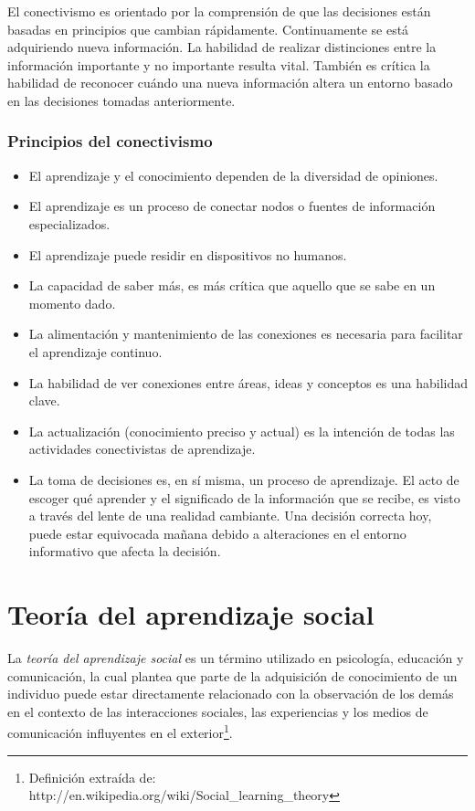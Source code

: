 El conectivismo es orientado por la comprensión de que las decisiones están
basadas en principios que cambian rápidamente. Continuamente se está adquiriendo
nueva información. La habilidad de realizar distinciones entre la información
importante y no importante resulta vital. También es crítica la habilidad de
reconocer cuándo una nueva información altera un entorno basado en las
decisiones tomadas anteriormente.

\subsubsection{Principios del conectivismo}

\begin{itemize}
\item El aprendizaje y el conocimiento dependen de la diversidad de opiniones.
\item El aprendizaje es un proceso de conectar nodos o fuentes de información
especializados.
\item El aprendizaje puede residir en dispositivos no humanos.
\item La capacidad de saber más, es más crítica que aquello que se sabe en un
momento dado.
\item La alimentación y mantenimiento de las conexiones es necesaria para
facilitar el aprendizaje continuo.
\item La habilidad de ver conexiones entre áreas, ideas y conceptos es una
habilidad clave.
\item La actualización (conocimiento preciso y actual) es la intención de todas
las actividades conectivistas de aprendizaje.
\item La toma de decisiones es, en sí misma, un proceso de aprendizaje. El acto
de escoger qué aprender y el significado de la información que se recibe, es
visto a través del lente de una realidad cambiante. Una decisión correcta hoy,
puede estar equivocada mañana debido a alteraciones en el entorno informativo
que afecta la decisión. 
\end{itemize}

\section{Teoría del aprendizaje social}

La \emph{teoría del aprendizaje social} es un término utilizado en psicología,
educación y comunicación, la cual plantea que parte de la adquisición de
conocimiento de un individuo puede estar directamente relacionado con la
observación de los demás en el contexto de las interacciones sociales, las
experiencias y los medios de comunicación influyentes en el
exterior\footnote{Definición extraída de:
http://en.wikipedia.org/wiki/Social\_learning\_theory}.

